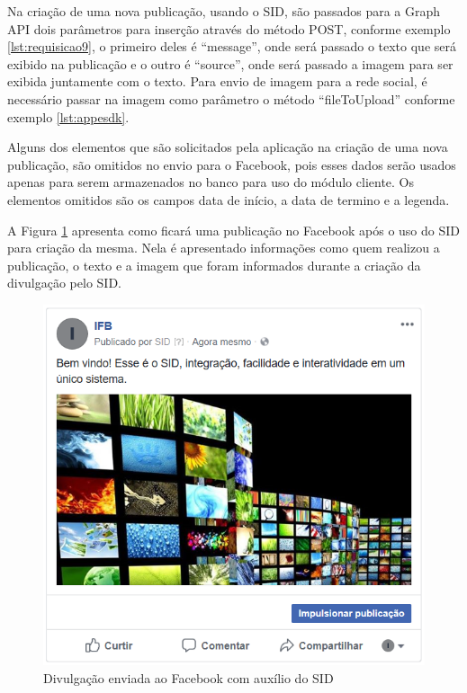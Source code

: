 Na criação de uma nova publicação, usando o SID, são passados para a Graph API dois parâmetros para inserção através do método POST, conforme exemplo \ref{lst:requisicao9}, o primeiro deles é “message”, onde será passado o texto que será exibido na publicação e o outro é “source”, onde será passado a imagem para ser exibida juntamente com o texto. Para envio de imagem para a rede social, é necessário passar na imagem como parâmetro o método “fileToUpload” conforme exemplo \ref{lst:appesdk}. 

Alguns dos elementos que são solicitados pela aplicação na criação de uma nova publicação, são omitidos no envio para o Facebook, pois esses dados serão usados apenas para serem armazenados no banco para uso do módulo cliente. Os elementos omitidos são os campos data de início, a data de termino e a legenda. 

A Figura \ref{fig:imgfacebook1} apresenta como ficará uma publicação no Facebook após o uso do SID para criação da mesma. Nela é apresentado informações como quem realizou a publicação, o texto e a imagem que foram informados durante a criação da divulgação pelo SID.

\begin{figure}[H]
\centering
\includegraphics[scale=1]{figuras/imgfacebook1}
\caption{Divulgação enviada ao Facebook com auxílio do SID}
\label{fig:imgfacebook1}
\end{figure}


